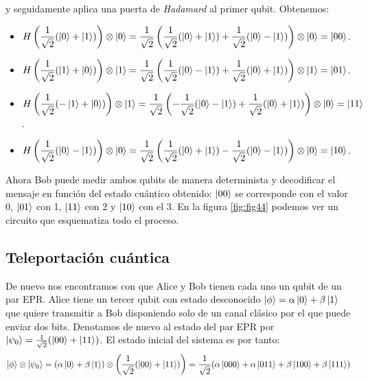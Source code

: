 y seguidamente aplica una puerta de \textit{Hadamard} al primer qubit. Obtenemos:

\begin{itemize}
\item $H\left(\dfrac{1}{\sqrt{2}}(\left|0\right\rangle+\left|1\right\rangle)\right)\otimes\left|0\right\rangle=\dfrac{1}{\sqrt{2}}\left(\dfrac{1}{\sqrt{2}}(\left|0\right\rangle+\left|1\right\rangle)+\dfrac{1}{\sqrt{2}}(\left|0\right\rangle-\left|1\right\rangle)\right)\otimes\left|0\right\rangle=\left|00\right\rangle$.
\item $H\left(\dfrac{1}{\sqrt{2}}(\left|1\right\rangle+\left|0\right\rangle)\right)\otimes\left|1\right\rangle=\dfrac{1}{\sqrt{2}}\left(\dfrac{1}{\sqrt{2}}(\left|0\right\rangle-\left|1\right\rangle)+\dfrac{1}{\sqrt{2}}(\left|0\right\rangle+\left|1\right\rangle)\right)\otimes\left|1\right\rangle=\left|01\right\rangle$.\item $H\left(\dfrac{1}{\sqrt{2}}(-\left|1\right\rangle+\left|0\right\rangle)\right)\otimes\left|1\right\rangle=\dfrac{1}{\sqrt{2}}\left(-\dfrac{1}{\sqrt{2}}(\left|0\right\rangle-\left|1\right\rangle)+\dfrac{1}{\sqrt{2}}(\left|0\right\rangle+\left|1\right\rangle)\right)\otimes\left|0\right\rangle=\left|11\right\rangle$.\item $H\left(\dfrac{1}{\sqrt{2}}(\left|0\right\rangle-\left|1\right\rangle)\right)\otimes\left|0\right\rangle=\dfrac{1}{\sqrt{2}}\left(\dfrac{1}{\sqrt{2}}(\left|0\right\rangle+\left|1\right\rangle)-\dfrac{1}{\sqrt{2}}(\left|0\right\rangle-\left|1\right\rangle)\right)\otimes\left|0\right\rangle=\left|10\right\rangle$.
\end{itemize}

Ahora Bob puede medir ambos qubits de manera determinista y decodificar el mensaje en función del estado cuántico obtenido: $\left|00\right\rangle$ se corresponde con el valor 0, $\left|01\right\rangle$ con 1, $\left|11\right\rangle$ con 2 y $\left|10\right\rangle$ con el 3. En la figura \ref{fig:fig44} podemos ver un circuito que esquematiza todo el proceso.

\subsection{Teleportación cuántica}

De nuevo nos encontramos con que Alice y Bob tienen cada uno un qubit de un par EPR. Alice tiene un tercer qubit con estado desconocido $\left|\phi\right\rangle=\alpha\left|0\right\rangle+\beta\left|1\right\rangle$ que quiere transmitir a Bob disponiendo solo de un canal clásico por el que puede enviar dos bits. Denotamos de nuevo al estado del par EPR por $\left|\psi_0\right\rangle=\frac{1}{\sqrt{2}}(\left|00\right\rangle+\left|11\right\rangle)$. El estado inicial del sistema es por tanto:
\begin{equation}
\left|\phi\right\rangle\otimes\left|\psi_0\right\rangle=(\alpha\left|0\right\rangle+\beta\left|1\right\rangle)\otimes\left(\dfrac{1}{\sqrt{2}}(\left|00\right\rangle+\left|11\right\rangle)\right)=\dfrac{1}{\sqrt{2}}(\alpha\left|000\right\rangle+\alpha\left|011\right\rangle+\beta\left|100\right\rangle+\beta\left|111\right\rangle)
\end{equation}


